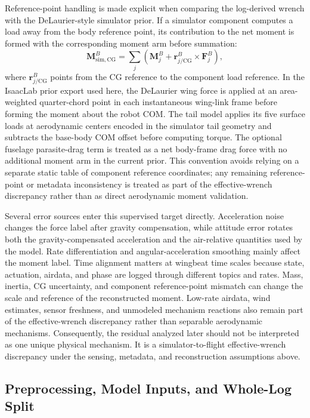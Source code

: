 Reference-point handling is made explicit when comparing the log-derived wrench with the DeLaurier-style simulator prior. If a simulator component computes a load away from the body reference point, its contribution to the net moment is formed with the corresponding moment arm before summation:
\begin{equation}
  \mathbf{M}_{\mathrm{sim,CG}}^{B}
  =
  \sum_j
  \left(
    \mathbf{M}_{j}^{B}
    +
    \mathbf{r}_{j/\mathrm{CG}}^{B}
    \times
    \mathbf{F}_{j}^{B}
  \right),
  \label{eq:sim_wrench_reference_shift}
\end{equation}
where $\mathbf{r}_{j/\mathrm{CG}}^{B}$ points from the CG reference to the component load reference. In the IsaacLab prior export used here, the DeLaurier wing force is applied at an area-weighted quarter-chord point in each instantaneous wing-link frame before forming the moment about the robot COM. The tail model applies its five surface loads at aerodynamic centers encoded in the simulator tail geometry and subtracts the base-body COM offset before computing torque. The optional fuselage parasite-drag term is treated as a net body-frame drag force with no additional moment arm in the current prior. This convention avoids relying on a separate static table of component reference coordinates; any remaining reference-point or metadata inconsistency is treated as part of the effective-wrench discrepancy rather than as direct aerodynamic moment validation.

Several error sources enter this supervised target directly. Acceleration noise changes the force label after gravity compensation, while attitude error rotates both the gravity-compensated acceleration and the air-relative quantities used by the model. Rate differentiation and angular-acceleration smoothing mainly affect the moment label. Time alignment matters at wingbeat time scales because state, actuation, airdata, and phase are logged through different topics and rates. Mass, inertia, CG uncertainty, and component reference-point mismatch can change the scale and reference of the reconstructed moment. Low-rate airdata, wind estimates, sensor freshness, and unmodeled mechanism reactions also remain part of the effective-wrench discrepancy rather than separable aerodynamic mechanisms. Consequently, the residual analyzed later should not be interpreted as one unique physical mechanism. It is a simulator-to-flight effective-wrench discrepancy under the sensing, metadata, and reconstruction assumptions above.

\subsection{Preprocessing, Model Inputs, and Whole-Log Split}
\label{subsec:canonical_samples}

